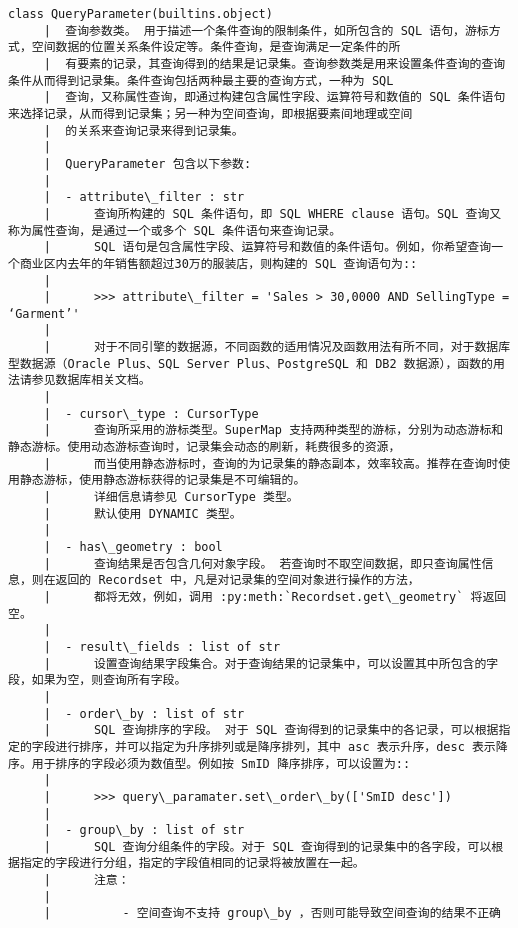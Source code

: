 \documentclass[11pt]{article}
\begin{document}
\begin{Verbatim}[commandchars=\\\{\}]
    class QueryParameter(builtins.object)
     |  查询参数类。 用于描述一个条件查询的限制条件，如所包含的 SQL 语句，游标方式，空间数据的位置关系条件设定等。条件查询，是查询满足一定条件的所
     |  有要素的记录，其查询得到的结果是记录集。查询参数类是用来设置条件查询的查询条件从而得到记录集。条件查询包括两种最主要的查询方式，一种为 SQL
     |  查询，又称属性查询，即通过构建包含属性字段、运算符号和数值的 SQL 条件语句来选择记录，从而得到记录集；另一种为空间查询，即根据要素间地理或空间
     |  的关系来查询记录来得到记录集。
     |  
     |  QueryParameter 包含以下参数:
     |  
     |  - attribute\_filter : str
     |      查询所构建的 SQL 条件语句，即 SQL WHERE clause 语句。SQL 查询又称为属性查询，是通过一个或多个 SQL 条件语句来查询记录。
     |      SQL 语句是包含属性字段、运算符号和数值的条件语句。例如，你希望查询一个商业区内去年的年销售额超过30万的服装店，则构建的 SQL 查询语句为::
     |  
     |      >>> attribute\_filter = 'Sales > 30,0000 AND SellingType = ‘Garment’'
     |  
     |      对于不同引擎的数据源，不同函数的适用情况及函数用法有所不同，对于数据库型数据源（Oracle Plus、SQL Server Plus、PostgreSQL 和 DB2 数据源），函数的用法请参见数据库相关文档。
     |  
     |  - cursor\_type : CursorType
     |      查询所采用的游标类型。SuperMap 支持两种类型的游标，分别为动态游标和静态游标。使用动态游标查询时，记录集会动态的刷新，耗费很多的资源，
     |      而当使用静态游标时，查询的为记录集的静态副本，效率较高。推荐在查询时使用静态游标，使用静态游标获得的记录集是不可编辑的。
     |      详细信息请参见 CursorType 类型。
     |      默认使用 DYNAMIC 类型。
     |  
     |  - has\_geometry : bool
     |      查询结果是否包含几何对象字段。 若查询时不取空间数据，即只查询属性信息，则在返回的 Recordset 中，凡是对记录集的空间对象进行操作的方法，
     |      都将无效，例如，调用 :py:meth:`Recordset.get\_geometry` 将返回空。
     |  
     |  - result\_fields : list of str
     |      设置查询结果字段集合。对于查询结果的记录集中，可以设置其中所包含的字段，如果为空，则查询所有字段。
     |  
     |  - order\_by : list of str
     |      SQL 查询排序的字段。 对于 SQL 查询得到的记录集中的各记录，可以根据指定的字段进行排序，并可以指定为升序排列或是降序排列，其中 asc 表示升序，desc 表示降序。用于排序的字段必须为数值型。例如按 SmID 降序排序，可以设置为::
     |  
     |      >>> query\_paramater.set\_order\_by(['SmID desc'])
     |  
     |  - group\_by : list of str
     |      SQL 查询分组条件的字段。对于 SQL 查询得到的记录集中的各字段，可以根据指定的字段进行分组，指定的字段值相同的记录将被放置在一起。
     |      注意：
     |  
     |          - 空间查询不支持 group\_by ，否则可能导致空间查询的结果不正确

\end{Verbatim}
\end{document}
